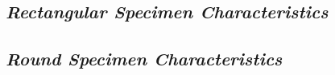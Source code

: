 \documentclass[11pt,a4paper]{article}
\numberwithin{equation}{subsection}
\begin{document}
\pagebreak	




\pagebreak
\cleardoublepage
{}

\appendixtitleon

\begin{appendices}
	\section{\textit{Rectangular Specimen Characteristics}}
\pagebreak

\end{appendices}

\begin{appendices}
	\section{\textit{Round Specimen Characteristics}}
	\pagebreak
	
\end{appendices}
\end{document}
